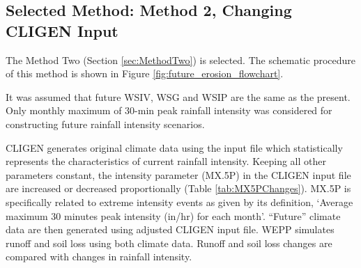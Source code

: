 
\subsection{Selected Method: Method 2, Changing CLIGEN Input}
\label{sec:SelectedMethod}

The Method Two (Section \ref{sec:MethodTwo}) is selected. The schematic
procedure of this method is shown in Figure \ref{fig:future_erosion_flowchart}.

It was assumed that future WSIV, WSG and WSIP are the same as the present. Only
monthly maximum of 30-min peak rainfall intensity was considered for
constructing future rainfall intensity scenarios.

CLIGEN generates original climate data using the input file which statistically
represents the characteristics of current rainfall intensity. Keeping all other
parameters constant, the intensity parameter ({MX.5P}) in the CLIGEN input file
are increased or decreased proportionally (Table \ref{tab:MX5PChanges}).
{MX.5P} is specifically related to extreme intensity events as given by its
definition, `Average maximum 30 minutes peak intensity (in/hr) for each month'.
``Future'' climate data are then generated using adjusted CLIGEN input file.
WEPP simulates runoff and soil loss using both climate data. Runoff and soil
loss changes are compared with changes in rainfall intensity.

